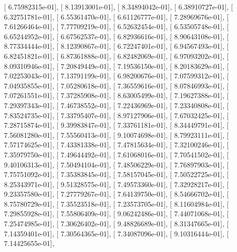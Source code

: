 \documentclass{article}
\begin{document}
       [  6.75982315e-01],
       [  8.13913001e-01],
       [  8.34894042e-01],
       [  6.38910727e-01],
       [  6.32751781e-01],
       [  6.55361470e-01],
       [  6.61126777e-01],
       [  7.28969676e-01],
       [  7.61266464e-01],
       [  7.77709219e-01],
       [  6.52632454e-01],
       [  6.53505748e-01],
       [  6.65244952e-01],
       [  6.67562537e-01],
       [  6.82936616e-01],
       [  8.90643108e-01],
       [  8.77334444e-01],
       [  8.12390867e-01],
       [  6.72247401e-01],
       [  6.94567493e-01],
       [  6.82451821e-01],
       [  6.87361888e-01],
       [  6.82482069e-01],
       [  6.97093202e-01],
       [  8.09310946e-01],
       [  7.20849449e-01],
       [  7.19536150e-01],
       [  8.20183629e-01],
       [  7.02253043e-01],
       [  7.13791199e-01],
       [  6.98200676e-01],
       [  7.07599312e-01],
       [  7.04935855e-01],
       [  7.05280618e-01],
       [  7.36559616e-01],
       [  8.07846993e-01],
       [  7.07261551e-01],
       [  7.37285908e-01],
       [  8.63005499e-01],
       [  7.19627388e-01],
       [  7.29397343e-01],
       [  7.46738552e-01],
       [  7.22436969e-01],
       [  7.23340808e-01],
       [  7.83524735e-01],
       [  7.33795407e-01],
       [  8.97127906e-01],
       [  7.67032425e-01],
       [  7.28715874e-01],
       [  9.39983847e-01],
       [  7.33761181e-01],
       [  8.34449791e-01],
       [  7.56081280e-01],
       [  7.55560413e-01],
       [  9.10074698e-01],
       [  8.79923111e-01],
       [  7.57174625e-01],
       [  7.43381338e-01],
       [  7.47815634e-01],
       [  7.32100246e-01],
       [  7.35979750e-01],
       [  7.49644492e-01],
       [  7.61068016e-01],
       [  7.70541502e-01],
       [  9.40106313e-01],
       [  7.50494104e-01],
       [  7.48506229e-01],
       [  7.76897903e-01],
       [  7.75751092e-01],
       [  7.35383845e-01],
       [  7.58157045e-01],
       [  7.50522725e-01],
       [  8.25343971e-01],
       [  9.51328575e-01],
       [  7.49573360e-01],
       [  7.32928217e-01],
       [  9.23357580e-01],
       [  7.27779267e-01],
       [  7.64139750e-01],
       [  8.54666702e-01],
       [  8.75780729e-01],
       [  7.35523518e-01],
       [  7.23573705e-01],
       [  8.11604984e-01],
       [  7.29855928e-01],
       [  7.55806409e-01],
       [  9.06242486e-01],
       [  7.44071068e-01],
       [  7.25474985e-01],
       [  7.30626402e-01],
       [  9.48826689e-01],
       [  8.31347665e-01],
       [  7.14359401e-01],
       [  7.30564365e-01],
       [  7.34087096e-01],
       [  9.10316444e-01],
       [  7.14425655e-01],
\end{document}
